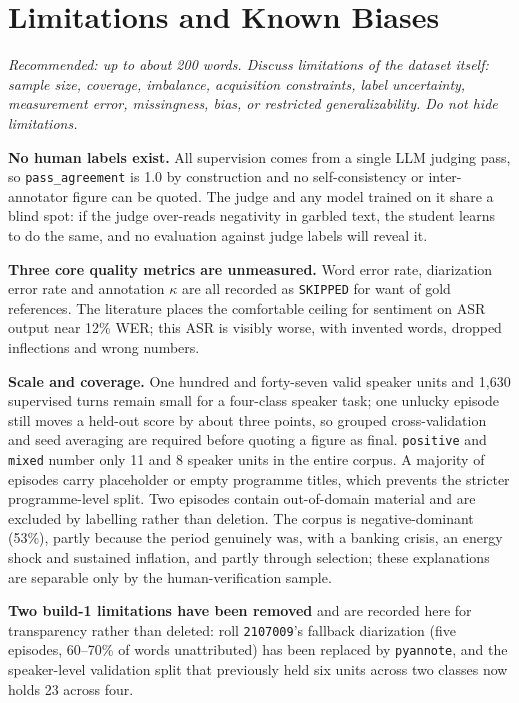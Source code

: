 \documentclass[11pt,a4paper]{article}
\begin{document}
\section{Limitations and Known Biases}

\emph{\small Recommended: up to about 200 words. Discuss limitations of the dataset itself: sample
size, coverage, imbalance, acquisition constraints, label uncertainty, measurement error,
missingness, bias, or restricted generalizability. Do not hide limitations.}

\textbf{No human labels exist.} All supervision comes from a single LLM judging pass, so
\texttt{pass\_agreement} is 1.0 by construction and no self-consistency or inter-annotator figure
can be quoted. The judge and any model trained on it share a blind spot: if the judge over-reads
negativity in garbled text, the student learns to do the same, and no evaluation against judge
labels will reveal it.

\textbf{Three core quality metrics are unmeasured.} Word error rate, diarization error rate and
annotation $\kappa$ are all recorded as \texttt{SKIPPED} for want of gold references. The
literature places the comfortable ceiling for sentiment on ASR output near 12\% WER; this ASR is
visibly worse, with invented words, dropped inflections and wrong numbers.

\textbf{Scale and coverage.} One hundred and forty-seven valid speaker units and 1{,}630
supervised turns remain small for a four-class speaker task; one unlucky episode still moves a
held-out score by about three points, so grouped cross-validation and seed averaging are required
before quoting a figure as final. \texttt{positive} and \texttt{mixed} number only 11 and 8
speaker units in the entire corpus. A majority of episodes carry placeholder or empty programme
titles, which prevents the stricter programme-level split. Two episodes contain out-of-domain
material and are excluded by labelling rather than deletion. The corpus is negative-dominant
(53\%), partly because the period genuinely was, with a banking crisis, an energy shock and
sustained inflation, and partly through selection; these explanations are separable only by
the human-verification sample.

\textbf{Two build-1 limitations have been removed} and are recorded here for transparency rather
than deleted: roll \texttt{2107009}'s fallback diarization (five episodes, 60--70\% of words
unattributed) has been replaced by \texttt{pyannote}, and the speaker-level validation split that
previously held six units across two classes now holds 23 across four.
\end{document}
